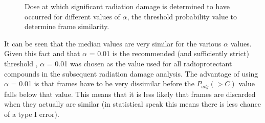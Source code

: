 \begin{figure}
\begin{subfigure}[b]{0.75\textwidth}
            \caption{}
            \label{}
    \end{subfigure}
    \caption[Dose at which significant radiation damage is determined to have occurred for different values of $\alpha$, the threshold probability value to determine frame similarity.]{Dose at which significant radiation damage is determined to have occurred for different values of $\alpha$, the threshold probability value to determine frame similarity.}
    \label{fig:alpha threshold value test}
\end{figure}
It can be seen that the median values are very similar for the various $\alpha$ values.
Given this fact and that $\alpha$ = 0.01 is the recommended (and sufficiently strict) threshold \cite{franke2015correlation}, $\alpha$ = 0.01 was chosen as the value used for all radioprotectant compounds in the subsequent radiation damage analysis.
The advantage of using $\alpha$ = 0.01 is that frames have to be very dissimilar before the $P_{adj}(>C)$ value falls below that value.
This means that it is less likely that frames are discarded when they actually are similar (in statistical speak this means there is less chance of a type I error).
